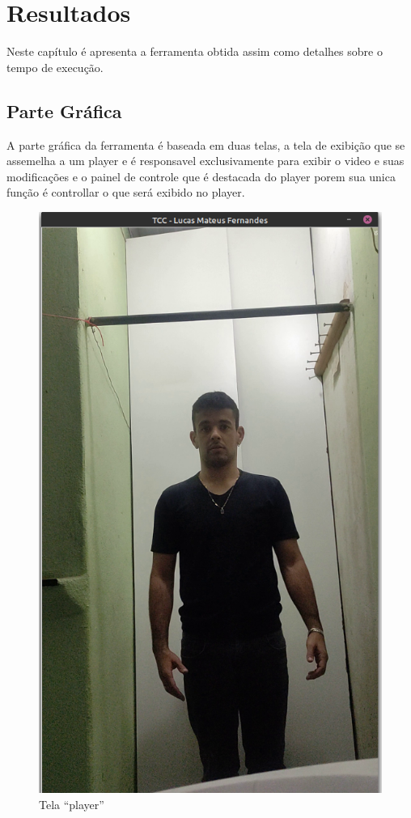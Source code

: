 \chapter{Resultados}

Neste capítulo é apresenta a ferramenta obtida assim como detalhes sobre o tempo de execução.


\section[Parte Gráfica]{Parte Gráfica}

A parte gráfica da ferramenta é baseada em duas telas, a tela de exibição que se assemelha a um player e é responsavel exclusivamente para exibir o video e suas modificações e o painel de controle que é destacada do player porem sua unica função é controllar o que será exibido no player.


\begin{figure}[H]
	\centering
	\caption{Tela ``player''}
	\includegraphics[scale=0.25]{figuras/view/player.png}
\end{figure}


